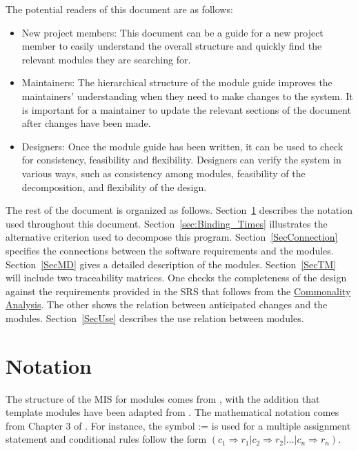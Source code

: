 \documentclass[12pt, titlepage]{article}
\begin{document}
The potential readers of this document are as follows:

\begin{itemize}
\item New project members: This document can be a guide for a new project member
  to easily understand the overall structure and quickly find the
  relevant modules they are searching for.
\item Maintainers: The hierarchical structure of the module guide improves the
  maintainers' understanding when they need to make changes to the system. It is
  important for a maintainer to update the relevant sections of the document
  after changes have been made.
\item Designers: Once the module guide has been written, it can be used to
  check for consistency, feasibility and flexibility. Designers can verify the
  system in various ways, such as consistency among modules, feasibility of the
  decomposition, and flexibility of the design.
\end{itemize}

The rest of the document is organized as follows. Section~\ref{sec:Notation} 
describes the notation used throughout this document. 
Section~\ref{sec:Binding_Times} illustrates the alternative criterion used to 
decompose this program.
Section~\ref{SecConnection} specifies the connections between the software 
requirements and the modules. Section~\ref{SecMD} gives a detailed description 
of the modules. Section~\ref{SecTM} will include two traceability matrices. 
One checks the completeness of the design against the requirements provided in 
the SRS that follows from the \href{../SRS/CA.pdf}{Commonality Analysis}. The 
other shows the relation between anticipated changes and the 
modules. Section~\ref{SecUse} describes the use relation between modules.

\section{Notation}\label{sec:Notation}


The structure of the MIS for modules comes from \citet{HoffmanAndStrooper1995},
with the addition that template modules have been adapted from
\cite{GhezziEtAl2003}.  The mathematical notation comes from Chapter 3 of
\citet{HoffmanAndStrooper1995}.  For instance, the symbol := is used for a
multiple assignment statement and conditional rules follow the form $(c_1
\Rightarrow r_1 | c_2 \Rightarrow r_2 | ... | c_n \Rightarrow r_n )$.
\end{document}
